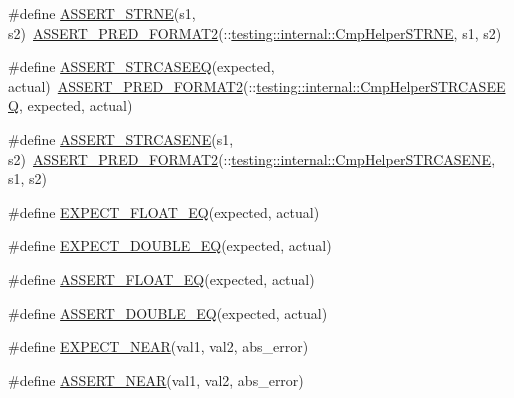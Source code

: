 \begin{DoxyCompactItemize}
\item 
\#define \hyperlink{fused-src_2gtest_2gtest_8h_a3d679660ac1b2f9f6e6c7608452af923}{\-A\-S\-S\-E\-R\-T\-\_\-\-S\-T\-R\-N\-E}(s1, s2)~\hyperlink{gtest__pred__impl_8h_ac452685a1a98ea3d96eb956a062ee210}{\-A\-S\-S\-E\-R\-T\-\_\-\-P\-R\-E\-D\-\_\-\-F\-O\-R\-M\-A\-T2}(\-::\hyperlink{namespacetesting_1_1internal_a24dfe04b51cda2637868440f0e6a7110}{testing\-::internal\-::\-Cmp\-Helper\-S\-T\-R\-N\-E}, s1, s2)
\item 
\#define \hyperlink{fused-src_2gtest_2gtest_8h_ad140c8b1f79ae534781784e580ab21a6}{\-A\-S\-S\-E\-R\-T\-\_\-\-S\-T\-R\-C\-A\-S\-E\-E\-Q}(expected, actual)~\hyperlink{gtest__pred__impl_8h_ac452685a1a98ea3d96eb956a062ee210}{\-A\-S\-S\-E\-R\-T\-\_\-\-P\-R\-E\-D\-\_\-\-F\-O\-R\-M\-A\-T2}(\-::\hyperlink{namespacetesting_1_1internal_aa5c3543f39545113a66c5b4d8f829fc6}{testing\-::internal\-::\-Cmp\-Helper\-S\-T\-R\-C\-A\-S\-E\-E\-Q}, expected, actual)
\item 
\#define \hyperlink{fused-src_2gtest_2gtest_8h_ac3d2c3836b103068a050f32585b2aaad}{\-A\-S\-S\-E\-R\-T\-\_\-\-S\-T\-R\-C\-A\-S\-E\-N\-E}(s1, s2)~\hyperlink{gtest__pred__impl_8h_ac452685a1a98ea3d96eb956a062ee210}{\-A\-S\-S\-E\-R\-T\-\_\-\-P\-R\-E\-D\-\_\-\-F\-O\-R\-M\-A\-T2}(\-::\hyperlink{namespacetesting_1_1internal_a87ee06a47690ee4681d40e1bf6a4a3c5}{testing\-::internal\-::\-Cmp\-Helper\-S\-T\-R\-C\-A\-S\-E\-N\-E}, s1, s2)
\item 
\#define \hyperlink{fused-src_2gtest_2gtest_8h_a5ce7d58df8cb696aa05e77c2370de7a8}{\-E\-X\-P\-E\-C\-T\-\_\-\-F\-L\-O\-A\-T\-\_\-\-E\-Q}(expected, actual)
\item 
\#define \hyperlink{fused-src_2gtest_2gtest_8h_a6e6277442d96cd18300619c321614397}{\-E\-X\-P\-E\-C\-T\-\_\-\-D\-O\-U\-B\-L\-E\-\_\-\-E\-Q}(expected, actual)
\item 
\#define \hyperlink{fused-src_2gtest_2gtest_8h_a965b7b85a1c2d26981a1dfa48f67ebda}{\-A\-S\-S\-E\-R\-T\-\_\-\-F\-L\-O\-A\-T\-\_\-\-E\-Q}(expected, actual)
\item 
\#define \hyperlink{fused-src_2gtest_2gtest_8h_a360ed28a372738adca9ac2fa9522e562}{\-A\-S\-S\-E\-R\-T\-\_\-\-D\-O\-U\-B\-L\-E\-\_\-\-E\-Q}(expected, actual)
\item 
\#define \hyperlink{fused-src_2gtest_2gtest_8h_a88cd7978af0e7dbd42cd606dfabdcc6f}{\-E\-X\-P\-E\-C\-T\-\_\-\-N\-E\-A\-R}(val1, val2, abs\-\_\-error)
\item 
\#define \hyperlink{fused-src_2gtest_2gtest_8h_a73cce6b752d204f91a36bef2f8e663b3}{\-A\-S\-S\-E\-R\-T\-\_\-\-N\-E\-A\-R}(val1, val2, abs\-\_\-error)

\end{DoxyCompactItemize}
